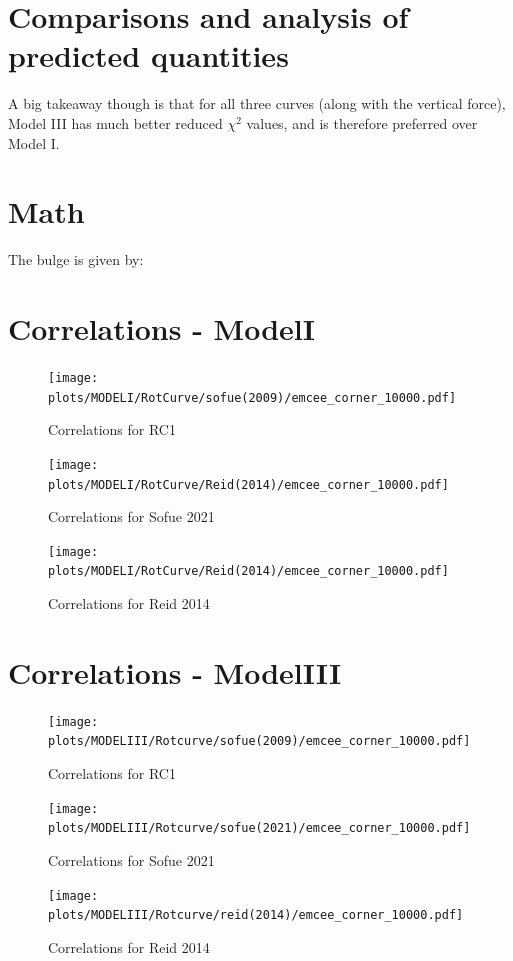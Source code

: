 \documentclass[fleqn,usenatbib]{mnras}
\begin{document}
\section{Comparisons and analysis of predicted quantities}

A big takeaway though is that for all three curves (along with the vertical force), Model III has much better reduced $\chi^2$ values, and is therefore preferred over Model I.







\appendix
\section{Math}

The bulge is given by:

\section{Correlations - ModelI}

\begin{figure}
\texttt{[image: plots/MODELI/RotCurve/sofue(2009)/emcee\_corner\_10000.pdf]}
\caption{Correlations for RC1
}
\label{fig:Model1_Sofue2009}
\end{figure}

\begin{figure}
\texttt{[image: plots/MODELI/RotCurve/Reid(2014)/emcee\_corner\_10000.pdf]}
\caption{Correlations for Sofue 2021
}
\label{fig:Model1_Sofue2021}
\end{figure}

\begin{figure}
\texttt{[image: plots/MODELI/RotCurve/Reid(2014)/emcee\_corner\_10000.pdf]}
\caption{Correlations for Reid 2014
}
\label{fig:Model1_Reid2014}
\end{figure}
\section{Correlations - ModelIII}

\begin{figure}
\texttt{[image: plots/MODELIII/Rotcurve/sofue(2009)/emcee\_corner\_10000.pdf]}
\caption{Correlations for RC1
}
\label{fig:Model3_Sofue2009}
\end{figure}

\begin{figure}
\texttt{[image: plots/MODELIII/Rotcurve/sofue(2021)/emcee\_corner\_10000.pdf]}
\caption{Correlations for Sofue 2021
}
\label{fig:Model3_Sofue2021}
\end{figure}

\begin{figure}
\texttt{[image: plots/MODELIII/Rotcurve/reid(2014)/emcee\_corner\_10000.pdf]}
\caption{Correlations for Reid 2014
}
\label{fig:Model3_Reid2014}
\end{figure}
\bsp	%
\label{lastpage}
\end{document}
